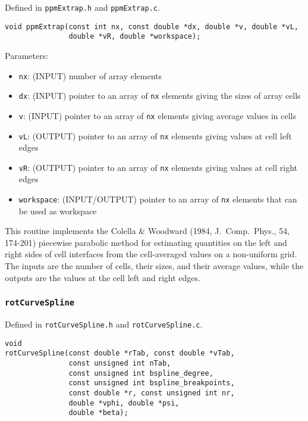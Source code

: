 \documentclass[12pt]{article}
\begin{document}
Defined in \verb=ppmExtrap.h= and \verb=ppmExtrap.c=.

\begin{verbatim}
void ppmExtrap(const int nx, const double *dx, double *v, double *vL, 
               double *vR, double *workspace);
\end{verbatim}

Parameters:
\begin{itemize}
\item \texttt{nx}: (INPUT) number of array elements
\item \texttt{dx}: (INPUT) pointer to an array of \verb=nx= elements giving the sizes of array cells
\item \texttt{v}: (INPUT) pointer to an array of \verb=nx= elements giving average values in cells
\item \texttt{vL}: (OUTPUT) pointer to an array of \verb=nx= elements giving values at cell left edges
\item \texttt{vR}: (OUTPUT) pointer to an array of \verb=nx= elements giving values at cell right edges
\item \texttt{workspace}: (INPUT/OUTPUT) pointer to an array of \verb=nx= elements that can be used as workspace
\end{itemize}

This routine implements the Colella \& Woodward (1984, J.~Comp.~Phys., 54, 174-201) piecewise parabolic method for estimating quantities on the left and right sides of cell interfaces from the cell-averaged values on a non-uniform grid. The inputs are the number of cells, their sizes, and their average values, while the outputs are the values at the cell left and right edges.

\subsubsection{\texttt{rotCurveSpline}}
\label{sssec:rotCurveSpline}

Defined in \verb=rotCurveSpline.h= and \verb=rotCurveSpline.c=.

\begin{verbatim}
void 
rotCurveSpline(const double *rTab, const double *vTab, 
               const unsigned int nTab,
               const unsigned int bspline_degree, 
               const unsigned int bspline_breakpoints,
               const double *r, const unsigned int nr, 
               double *vphi, double *psi,
               double *beta);
\end{verbatim}
\end{document}
